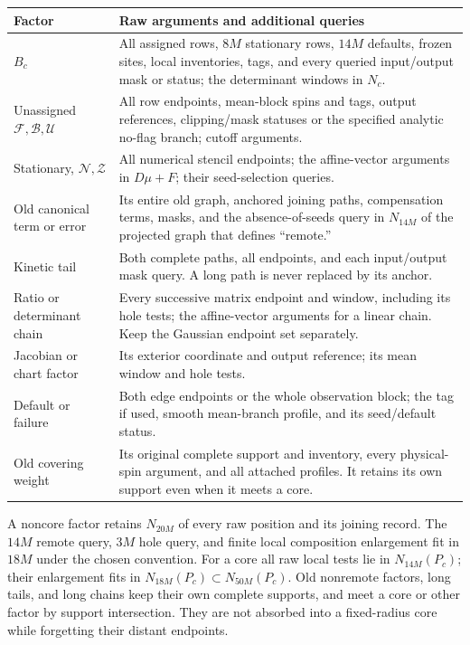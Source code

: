 \begin{center}\small
\begin{tabular}{>{\raggedright\arraybackslash}p{}p{}}
\toprule
Factor & Raw arguments and additional queries\\
\midrule
$B_c$ & All assigned rows, $8M$ stationary rows, $14M$ defaults,
frozen sites, local inventories, tags, and every queried input/output
mask or status; the determinant windows in $N_c$.\\[3pt]
Unassigned $\mathcal F,\mathcal B,\mathcal U$ & All row endpoints,
mean-block spins and tags, output references, clipping/mask statuses
or the specified analytic no-flag branch; cutoff arguments.\\[3pt]
Stationary, $\mathcal N,\mathcal Z$ & All numerical stencil endpoints;
the affine-vector arguments in $D\mu+F$; their seed-selection queries.\\[3pt]
Old canonical term or error & Its entire old graph, anchored joining
paths, compensation terms, masks, and the absence-of-seeds query in
$N_{14M}$ of the projected graph that defines ``remote.''\\[3pt]
Kinetic tail & Both complete paths, all endpoints, and each input/output
mask query.  A long path is never replaced by its anchor.\\[3pt]
Ratio or determinant chain & Every successive matrix endpoint and
window, including its hole tests; the affine-vector arguments for a
linear chain.  Keep the Gaussian endpoint set separately.\\[3pt]
Jacobian or chart factor & Its exterior coordinate and output reference;
its mean window and hole tests.\\[3pt]
Default or failure & Both edge endpoints or the whole observation block;
the tag if used, smooth mean-branch profile, and its seed/default status.\\[3pt]
Old covering weight & Its original complete support and inventory,
every physical-spin argument, and all attached profiles.  It retains its
own support even when it meets a core.\\
\bottomrule
\end{tabular}
\end{center}

A noncore factor retains $N_{20M}$ of every raw position and its
joining record.  The $14M$ remote query, $3M$ hole query, and finite
local composition enlargement fit in $18M$ under the chosen convention.
For a core all raw local tests lie in $N_{14M}(P_c)$; their enlargement
fits in $N_{18M}(P_c)\subset N_{50M}(P_c)$.  Old nonremote factors,
long tails, and long chains keep their own complete supports, and meet
a core or other factor by support intersection.  They are not absorbed
into a fixed-radius core while forgetting their distant endpoints.

